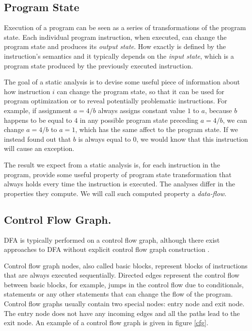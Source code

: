         \subsection{Program State}
        Execution of a program can be seen as a series of transformations of 
        the program state. Each individual program instruction, when executed, 
        can change the program state and produces its \emph{output state}.         
        How exactly is defined by the instruction's semantics and it typically 
        depends on the \emph{input state}, which is a program state produced 
        by the previously executed instruction. 
        
        The goal of a static analysis is to devise some useful piece of information 
        about how instruction $i$ can change the program state, so that it can 
        be used for program optimization or to reveal potentially problematic 
        instructions. For example, if assignment $a=4/b$ always assigns 
        constant value $1$ to $a$, because $b$ happens to be equal to $4$ 
        in any possible program state preceding $a=4/b$, we can change 
        $a=4/b$ to $a=1$, which has the same affect to the program state. 
        If we instead found out that $b$ is always equal to $0$, we would 
        know that this instruction will cause an exception.
        
        The result we expect from a static analysis is, for each instruction 
        in the program, provide some useful property of program state transformation 
        that always holds every time the instruction is executed. 
        The analyses differ in the properties they compute. 
        We will call such computed property a \emph{data-flow}.
        
        
        \subsection{Control Flow Graph.} 
        DFA is typically performed on a control flow graph, 
        although there exist approaches to DFA 
        without explicit control flow graph 
        construction \cite{mohnen2002graph}.
        
        Control flow graph nodes, also called basic blocks, 
        represent blocks of instructions that are always 
        executed sequentially. Directed edges represent the control 
        flow between basic blocks, for example, jumps in the control 
        flow due to conditionals,  statements or any 
        other statements that can change the flow of the program.        
        Control flow graphs usually contain two special nodes: 
        entry node and exit node. The entry node does not have any 
        incoming edges and all the paths lead to the exit node.        
        An example of a control flow graph is given in figure \ref{cfg}.
        

